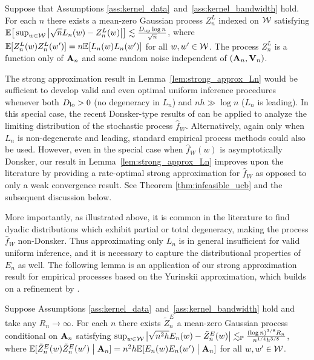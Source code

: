 \begin{lemma}
  \label{lem:strong_approx_Ln}
  Suppose that Assumptions \ref{ass:kernel_data}~and~\ref{ass:kernel_bandwidth}
  hold. For each $n$ there exists a mean-zero Gaussian process $Z^L_n$ indexed
  on $\mathcal{W}$ satisfying
  $\mathbb{E}\big[ \sup_{w \in \mathcal{W}} \big| \sqrt{n} L_n(w) - Z_n^L(w) \big| \big]
  \lesssim \frac{D_{\textup{up}} \log n}{\sqrt{n}}$, where
  $\mathbb{E}[Z_n^L(w)Z_n^L(w')] =  n\mathbb{E}[L_n(w)L_n(w')]$ for all $w, w' \in \mathcal{W}$. The
  process $Z_n^L$ is a function only of $\mathbf{A}_n$ and some random noise
  independent of $(\mathbf{A}_n, \mathbf{V}_n)$.
\end{lemma}

The strong approximation result in Lemma~\ref{lem:strong_approx_Ln} would be
sufficient to develop valid and even optimal uniform inference procedures
whenever both $D_{\textup{lo}} > 0$ (no degeneracy in $L_n$) and $n h \gg \log n$
($L_n$ is leading). In this special case, the recent Donsker-type results of
\citet{davezies2021exchangeable} can be applied to analyze the limiting
distribution of the stochastic process $\hat{f}_W$. Alternatively, again only
when $L_n$ is non-degenerate and leading, standard empirical process methods
could also be used. However, even in the special case when $\hat{f}_W(w)$ is
asymptotically Donsker, our result in Lemma~\ref{lem:strong_approx_Ln} improves
upon the literature by providing a rate-optimal strong approximation for
$\hat{f}_W$ as opposed to only a weak convergence result. See Theorem
\ref{thm:infeasible_ucb} and the subsequent discussion below.

More importantly, as illustrated above, it is common in the literature to find
dyadic distributions which exhibit partial or total degeneracy, making the
process $\hat{f}_W$ non-Donsker. Thus approximating only $L_n$ is in general
insufficient for valid uniform inference, and it is necessary to capture the
distributional properties of $E_n$ as well.
The following lemma is an application of our strong approximation result for
empirical processes based on the Yurinskii approximation, which builds on a
refinement by \citet{belloni2019conditional}.

\begin{lemma}
  \label{lem:conditional_strong_approx_En}
  Suppose Assumptions \ref{ass:kernel_data}~and~\ref{ass:kernel_bandwidth} hold
  and take any $R_n \to \infty$. For each $n$ there exists $\tilde Z^E_n$
  a mean-zero Gaussian process conditional on $\mathbf{A}_n$ satisfying
  $\sup_{w \in \mathcal{W}}
  \big| \sqrt{n^2h} E_n(w) - \tilde Z_n^E(w) \big|
  \lesssim_{\mathbb{P}} \frac{(\log n)^{3/8} R_n}{n^{1/4}h^{3/8}}$,
  where $\mathbb{E}[\tilde Z_n^E(w)\tilde Z_n^E(w')\bigm\vert \mathbf{A}_n]
  =n^2h\mathbb{E}[E_n(w)E_n(w')\bigm\vert \mathbf{A}_n]$
  for all $w, w' \in \mathcal{W}$.
\end{lemma}

